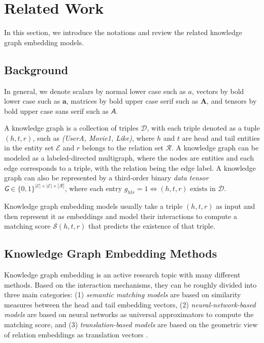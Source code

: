 \documentclass{ecai}
\def\va{{\bm{a}}}
\def\mA{{\bm{A}}}
\newcommand{\tens}[1]{\bm{\mathsfit{#1}}}
\def\tA{{\tens{A}}}
\def\tG{{\tens{G}}}
\def\gD{{\mathcal{D}}}
\def\gE{{\mathcal{E}}}
\def\gR{{\mathcal{R}}}
\def\gS{{\mathcal{S}}}
\theoremstyle{plain}  \newtheorem{thm}{Theorem}  \newtheorem{lem}[thm]{Lemma}  \newtheorem{prop}[thm]{Proposition}
\theoremstyle{remark}  \newtheorem*{rem}{Remark}
\begin{document}
\section{Related Work} \label{sect:relatedwork} In this section, we introduce the notations and review the related knowledge graph embedding models.

\subsection{Background} \label{sect:background} In general, we denote scalars by normal lower case such as $ a $, vectors by bold lower case such as $ \va $, matrices by bold upper case serif such as $ \mA $, and tensors by bold upper case sans serif such as $ \tA $. 

A knowledge graph is a collection of triples $ \gD $, with each triple denoted as a tuple $ (h, t, r) $, such as \textit{(UserA, Movie1, Like)}, where $ h $ and $ t $ are head and tail entities in the entity set $ \gE $ and $ r $ belongs to the relation set $ \gR $. A knowledge graph can be modeled as a labeled-directed multigraph, where the nodes are entities and each edge corresponds to a triple, with the relation being the edge label. A knowledge graph can also be represented by a third-order binary \textit{data tensor} $ \tG \in \{0, 1\}^{|\gE| \times |\gE| \times |\gR|} $, where each entry $ g_{htr} = 1 \Leftrightarrow (h, t, r) \text{ exists in } \gD $.

Knowledge graph embedding models usually take a triple $ (h, t, r) $ as input and then represent it as embeddings and model their interactions to compute a matching score $ \gS(h, t, r) $ that predicts the existence of that triple. 

\subsection{Knowledge Graph Embedding Methods} Knowledge graph embedding is an active research topic with many different methods. Based on the interaction mechanisms, they can be roughly divided into three main categories: (1) \textit{semantic matching models} are based on similarity measures between the head and tail embedding vectors, (2) \textit{neural-network-based models} are based on neural networks as universal approximators to compute the matching score, and (3) \textit{translation-based models} are based on the geometric view of relation embeddings as translation vectors \cite{tran_analyzingknowledgegraph_2019,wang_knowledgegraphembedding_2017}.
\end{document}
